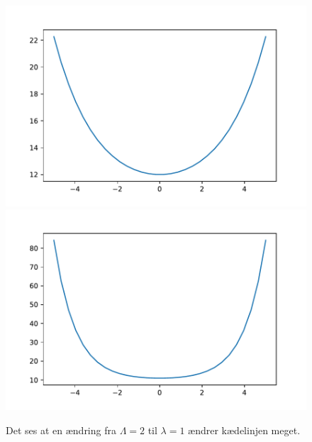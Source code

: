 \begin{figure}[h!]
\includegraphics[scale=0.5]{code/fig3}
\includegraphics[scale=0.5]{code/fig4}
\caption{Det ses at en ændring fra $\Lambda=2$ til $\lambda=1$ ændrer kædelinjen meget.}
\end{figure}

